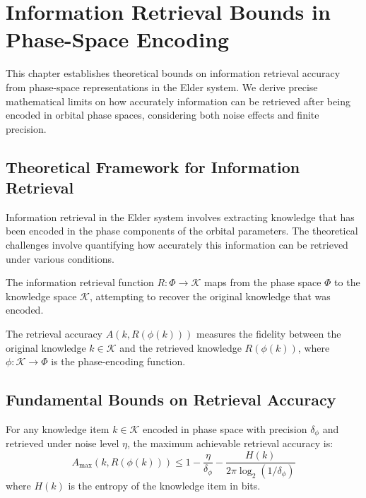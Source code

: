 \chapter{Information Retrieval Bounds in Phase-Space Encoding}

This chapter establishes theoretical bounds on information retrieval accuracy from phase-space representations in the Elder system. We derive precise mathematical limits on how accurately information can be retrieved after being encoded in orbital phase spaces, considering both noise effects and finite precision.

\section{Theoretical Framework for Information Retrieval}

Information retrieval in the Elder system involves extracting knowledge that has been encoded in the phase components of the orbital parameters. The theoretical challenges involve quantifying how accurately this information can be retrieved under various conditions.

\begin{definition}
The information retrieval function $R: \Phi \rightarrow \mathcal{K}$ maps from the phase space $\Phi$ to the knowledge space $\mathcal{K}$, attempting to recover the original knowledge that was encoded.
\end{definition}

\begin{definition}
The retrieval accuracy $A(k, R(\phi(k)))$ measures the fidelity between the original knowledge $k \in \mathcal{K}$ and the retrieved knowledge $R(\phi(k))$, where $\phi: \mathcal{K} \rightarrow \Phi$ is the phase-encoding function.
\end{definition}

\section{Fundamental Bounds on Retrieval Accuracy}

\begin{theorem}
For any knowledge item $k \in \mathcal{K}$ encoded in phase space with precision $\delta_\phi$ and retrieved under noise level $\eta$, the maximum achievable retrieval accuracy is:
\begin{equation}
A_{\max}(k, R(\phi(k))) \leq 1 - \frac{\eta}{\delta_\phi} - \frac{H(k)}{2\pi \log_2(1/\delta_\phi)}
\end{equation}
where $H(k)$ is the entropy of the knowledge item in bits.
\end{theorem}

